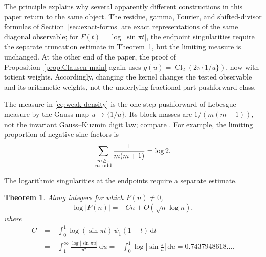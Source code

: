 \documentclass[11pt]{amsart}
\numberwithin{equation}{section}
\newtheorem{theorem}{Theorem}[section]
\theoremstyle{definition}
\theoremstyle{remark}
\newcommand{\dd}{\,\mathrm d}
\begin{document}
The principle explains why several apparently different constructions in
this paper return to the same object.  The residue, gamma, Fourier, and
shifted-divisor formulas of Section~\ref{sec:exact-forms} are exact
representations of the same diagonal observable; for
\(F(t)=\log|\sin\pi t|\), the endpoint singularities require the separate
truncation estimate in Theorem~\ref{thm:scale}, but the limiting measure is
unchanged.  At the other end of the paper, the proof of
Proposition~\ref{prop:Clausen-main} again uses
\(g(u)=\operatorname{Cl}_2(2\pi\{1/u\})\), now with totient weights.
Accordingly, changing the kernel changes the tested observable and its
arithmetic weights, not the underlying fractional-part pushforward class.

The measure in \eqref{eq:weak-density} is the one-step pushforward of
Lebesgue measure by the Gauss map \(u\mapsto\{1/u\}\).  Its block masses
are \(1/(m(m+1))\), not the invariant Gauss--Kuzmin digit law; compare
\cite{Mayer1989}.  For example, the limiting proportion of negative sine
factors is
\begin{equation}\label{eq:negative-proportion}
 \sum_{\substack{m\geq1\\m\ {\rm odd}}}\frac1{m(m+1)}=\log2.
\end{equation}

The logarithmic singularities at the endpoints require a separate
estimate.

\begin{theorem}\label{thm:scale}
Along integers for which \(P(n)\ne0\),
\begin{equation}\label{eq:scale}
 \log|P(n)|=-Cn+O(\sqrt n\log n),
\end{equation}
where
\begin{align}
 C
 &=-\int_0^1\log(\sin\pi t)\,\psi_1(1+t)\dd t\label{eq:C-density}\\
 &=-\int_1^\infty\frac{\log|\sin\pi u|}{u^2}\dd u
 =-\int_0^1\log\left|\sin\frac{\pi}{u}\right|\dd u
 =0.7437948618\ldots.\label{eq:C-integrals}
\end{align}
\end{theorem}
\end{document}
